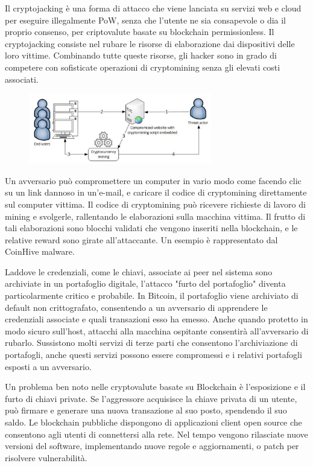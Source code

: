 Il cryptojacking è una forma di attacco che viene lanciata su servizi
web e cloud per eseguire illegalmente PoW, senza che l'utente ne sia consapevole o dia il proprio consenso, per criptovalute basate su blockchain permissionless. Il cryptojacking consiste nel rubare le risorse di elaborazione dai dispositivi delle loro vittime. Combinando tutte queste risorse, gli hacker sono in grado di competere con sofisticate operazioni di cryptomining senza gli elevati costi associati.

\begin{figure}[htb!]
    \centering
    \includegraphics[width=8cm]{./Images/cap5/5.8.png}
\end{figure}

Un avversario può compromettere un computer in vario modo come facendo clic su un link
dannoso in un'e-mail, e caricare il codice di cryptomining direttamente sul computer
vittima. Il codice di cryptomining può ricevere richieste di lavoro di mining e svolgerle, rallentando
le elaborazioni sulla macchina vittima. Il frutto di tali elaborazioni sono blocchi validati che
vengono inseriti nella blockchain, e le relative reward sono girate all’attaccante. Un esempio è rappresentato
dal CoinHive malware.

Laddove le credenziali, come le chiavi, associate ai peer nel sistema
sono archiviate in un portafoglio digitale, l'attacco "furto del
portafoglio" diventa particolarmente critico e probabile. In Bitcoin, il portafoglio viene archiviato di default non
crittografato, consentendo a un avversario di apprendere le
credenziali associate e quali transazioni esso ha emesso. Anche quando protetto in modo sicuro
sull'host, attacchi alla macchina ospitante consentirà all’avversario di rubarlo. Sussistono molti servizi di terze parti che
consentono l'archiviazione di portafogli,
anche questi servizi possono essere
compromessi e i relativi portafogli
esposti a un avversario.

Un problema ben noto nelle cryptovalute
basate su Blockchain è l'esposizione e il
furto di chiavi private. Se l'aggressore acquisisce la chiave
privata di un utente, può firmare e
generare una nuova transazione al
suo posto, spendendo il suo saldo.
Le blockchain pubbliche dispongono di applicazioni client open
source che consentono agli utenti di connettersi alla rete. Nel tempo
vengono rilasciate nuove versioni del software, implementando
nuove regole e aggiornamenti, o patch per risolvere vulnerabilità.

